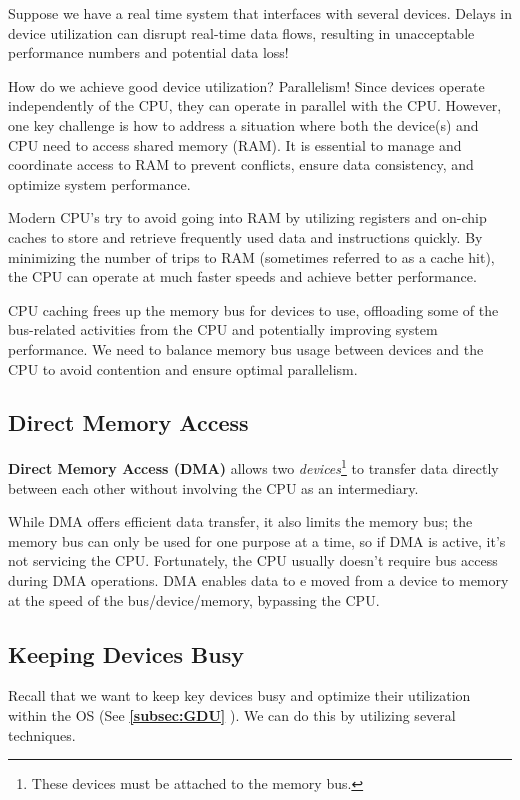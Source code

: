 \documentclass{report}
\newcommand{\definitionBegin}[1]{\begin{tcolorbox}[title={Definition: #1}]}
\newcommand{\definitionEnd}{\end{tcolorbox}}
\newcommand{\exampleBegin}[1]{\begin{tcolorbox}[colback=blue!5!white,colframe=black!75!blue,title={Example:
      #1}]}
\newcommand{\exampleEnd}{\end{tcolorbox}}
\newcommand{\asideBegin}[1]{\begin{tcolorbox}[colback=orange!5!white,colframe=black!75!orange,title={Aside:
      #1}]}
\newcommand{\asideEnd}{\end{tcolorbox}}
\newcommand{\refto}[2]{\textbf{\ref{#1:#2} \nameref{#1:#2}}}
\begin{document}
\exampleBegin{Device Delays}
Suppose we have a real time system that interfaces with several devices.  Delays in device
utilization can disrupt real-time data flows, resulting in unacceptable performance numbers and
potential data loss!
\exampleEnd

How do we achieve good device utilization? Parallelism! Since devices operate independently of the
CPU, they can operate in parallel with the CPU. However, one key challenge is how to address a
situation where both the device(s) and CPU need to access shared memory (RAM). It is essential to
manage and coordinate access to RAM to prevent conflicts, ensure data consistency, and optimize
system performance.

\asideBegin{CPU Caching}
Modern CPU's try to avoid going into RAM by utilizing registers and on-chip caches to store and
retrieve frequently used data and instructions quickly. By minimizing the number of trips to RAM
(sometimes referred to as a cache hit), the CPU can operate at much faster speeds and achieve better
performance.
\asideEnd

CPU caching frees up the memory bus for devices to use, offloading some of the bus-related
activities from the CPU and potentially improving system performance. We need to balance memory bus
usage between devices and the CPU to avoid contention and ensure optimal parallelism.


\subsection{Direct Memory Access}
\definitionBegin{Direct Memory Access}
\textbf{Direct Memory Access (DMA)} allows two \textit{devices}\footnote{These devices must be
  attached to the memory bus.} to transfer data directly between each other without involving the
CPU as an intermediary.
\definitionEnd

While DMA offers efficient data transfer, it also limits the memory bus; the memory bus can only be
used for one purpose at a time, so if DMA is active, it's not servicing the CPU. Fortunately, the
CPU usually doesn't require bus access during DMA operations. DMA enables data to e moved from a
device to memory at the speed of the bus/device/memory, bypassing the CPU. 


\subsection{Keeping Devices Busy}
Recall that we want to keep key devices busy and optimize their utilization within the OS (See
\refto{subsec}{GDU}). We can do this by utilizing several techniques.
\end{document}
